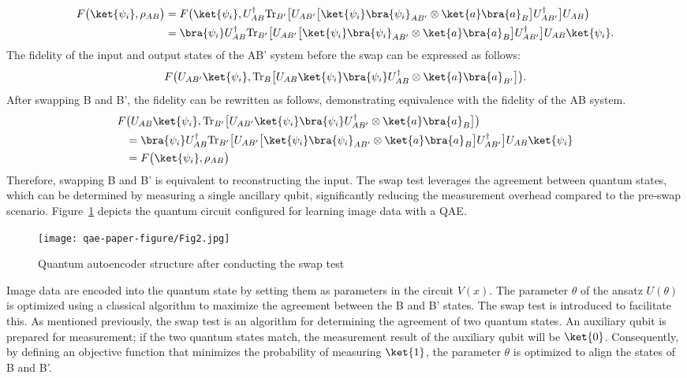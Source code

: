 \begin{align}
F \big(\ket{\psi_i}, \rho_{AB} \big) &= F \big( \ket{\psi_i}, U_{AB}^\dagger \mathrm{Tr}_{B'} \big[ U_{AB'} \big[ \ket{\psi_i} \bra{\psi_i}_{AB'} \otimes \ket{a} \bra{a}_{B} \big] U_{AB'}^\dagger \big] U_{AB} \big) \nonumber \\
&= \bra{\psi_i} U_{AB}^\dagger \mathrm{Tr}_{B'} \big[ U_{AB'} \big[ \ket{\psi_i} \bra{\psi_i}_{AB'} \otimes \ket{a} \bra{a}_{B} \big] U_{AB'}^\dagger \big] U_{AB}  \ket{\psi_i}. \label{eq:F_AB}
\end{align}
The fidelity of the input and output states of the AB' system before the swap can be expressed as follows:
\begin{equation}
F \big( U_{AB'} \ket{\psi_i}, \mathrm{Tr}_{B} \big[ U_{AB} \ket{\psi_i} \bra{\psi_i} U_{AB}^\dagger \otimes \ket{a} \bra{a}_{B'} \big] \big). \label{eq:F_AB'}
\end{equation}
After swapping B and B', the fidelity can be rewritten as follows, demonstrating equivalence with the fidelity of the AB system.
\begin{align}
F &\big( U_{AB} \ket{\psi_i}, \mathrm{Tr}_{B'} \big[ U_{AB'} \ket{\psi_i} \bra{\psi_i} U_{AB'}^\dagger \otimes \ket{a} \bra{a}_{B} \big] \big) \nonumber \\
&= \bra{\psi_i} U_{AB}^\dagger \mathrm{Tr}_{B'} \big[ U_{AB'} \big[ \ket{\psi_i} \bra{\psi_i}_{AB'} \otimes \ket{a} \bra{a}_{B} \big] U_{AB'}^\dagger \big] U_{AB}  \ket{\psi_i} \nonumber \\
&= F \big(\ket{\psi_i}, \rho_{AB} \big) \label{eq:F_AB'_swap}
\end{align}
Therefore, swapping B and B' is equivalent to reconstructing the input. The swap test leverages the agreement between quantum states, which can be determined by measuring a single ancillary qubit, significantly reducing the measurement overhead compared to the pre-swap scenario. Figure~\ref{fig:QAE_with_swap} depicts the quantum circuit configured for learning image data with a QAE.
\begin{figure}[t]
\centering
\texttt{[image: qae-paper-figure/Fig2.jpg]}
\caption{Quantum autoencoder structure after conducting the swap test}\label{fig:QAE_with_swap}
\end{figure}
Image data are encoded into the quantum state by setting them as parameters in the circuit $V(x)$. The parameter $\theta$ of the ansatz $U(\theta)$ is optimized using a classical algorithm to maximize the agreement between the B and B' states. The swap test is introduced to facilitate this. As mentioned previously, the swap test is an algorithm for determining the agreement of two quantum states. An auxiliary qubit is prepared for measurement; if the two quantum states match, the measurement result of the auxiliary qubit will be $\ket{0}$. Consequently, by defining an objective function that minimizes the probability of measuring $\ket {1}$, the parameter $\theta$ is optimized to align the states of B and B'.